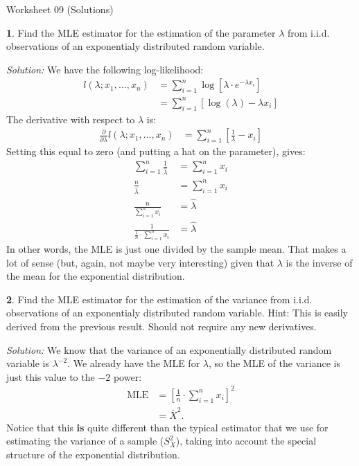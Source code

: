 \documentclass{tufte-handout}
\begin{document}
\justify

{\LARGE Worksheet 09 (Solutions)}

\vspace*{18pt}


\textbf{1}. Find the MLE estimator for the estimation of the parameter $\lambda$ from
i.i.d. observations of an exponentialy distributed random variable.

\textit{Solution:} We have the following log-likelihood:
\begin{align*}
l(\lambda; x_1, \ldots, x_n) &= \sum_{i=1}^n \log\left[ \lambda \cdot e^{-\lambda x_i} \right] \\
&= \sum_{i=1}^n \left[\log(\lambda) - \lambda x_i \right]
\end{align*}
The derivative with respect to $\lambda$ is:
\begin{align*}
\frac{\partial}{\partial \lambda} l(\lambda; x_1, \ldots, x_n)
&= \sum_{i=1}^n \left[ \frac{1}{\lambda} - x_i \right] 
\end{align*}
Setting this equal to zero (and putting a hat on the parameter), gives:
\begin{align*}
\sum_{i=1}^n \frac{1}{\hat{\lambda}} &= \sum_{i=1}^n x_i \\
\frac{n}{\hat{\lambda}} &= \sum_{i=1}^n x_i \\
\frac{n}{\sum_{i=1}^n x_i} &= \hat{\lambda} \\
\frac{1}{\frac{1}{n} \cdot \sum_{i=1}^n x_i} &= \hat{\lambda} 
\end{align*}
In other words, the MLE is just one divided by the sample mean. That makes
a lot of sense (but, again, not maybe very interesting) given that $\lambda$
is the inverse of the mean for the exponential distribution.

\textbf{2}. Find the MLE estimator for the estimation of the variance from
i.i.d. observations of an exponentialy distributed random variable.
Hint: This is easily derived from the previous result. Should not 
require any new derivatives.

\textit{Solution:} We know that the variance of an exponentially distributed random variable
is $\lambda^{-2}$. We already have the MLE for $\lambda$, so the MLE of the
variance is just this value to the $-2$ power:
\begin{align*}
\text{MLE} &= \left[ \frac{1}{n} \cdot \sum_{i=1}^n x_i \right]^2 \\
&= \bar{X}^2.
\end{align*}
Notice that this \textbf{is} quite different than the typical estimator that
we use for estimating the variance of a sample ($S_X^2$), taking into account
the special structure of the exponential distribution.
\end{document}
